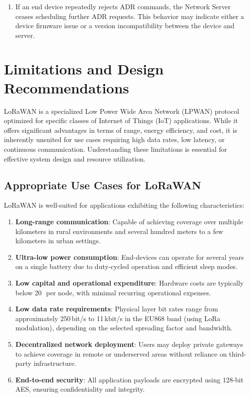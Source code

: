 \begin{enumerate}
    \item If an end device repeatedly rejects ADR commands, the Network Server ceases scheduling further ADR requests. This behavior may indicate either a device firmware issue or a version incompatibility between the device and server.
\end{enumerate}

\section{Limitations and Design Recommendations}

LoRaWAN is a specialized Low Power Wide Area Network (LPWAN) protocol optimized for specific classes of Internet of Things (IoT) applications. While it offers significant advantages in terms of range, energy efficiency, and cost, it is inherently unsuited for use cases requiring high data rates, low latency, or continuous communication. Understanding these limitations is essential for effective system design and resource utilization.

\subsection{Appropriate Use Cases for LoRaWAN}

LoRaWAN is well-suited for applications exhibiting the following characteristics:

\begin{enumerate}
    \item \textbf{Long-range communication}: Capable of achieving coverage over multiple kilometers in rural environments and several hundred meters to a few kilometers in urban settings.
    \item \textbf{Ultra-low power consumption}: End-devices can operate for several years on a single battery due to duty-cycled operation and efficient sleep modes.
    \item \textbf{Low capital and operational expenditure}: Hardware costs are typically below 20\,\texteuro\ per node, with minimal recurring operational expenses.
    \item \textbf{Low data rate requirements}: Physical layer bit rates range from approximately 250\,bit/s to 11\,kbit/s in the EU868 band (using LoRa modulation), depending on the selected spreading factor and bandwidth.
    \item \textbf{Decentralized network deployment}: Users may deploy private gateways to achieve coverage in remote or underserved areas without reliance on third-party infrastructure.
    \item \textbf{End-to-end security}: All application payloads are encrypted using 128-bit AES, ensuring confidentiality and integrity.
\end{enumerate}

